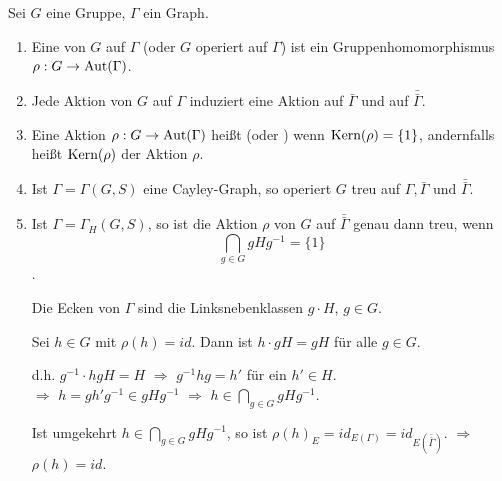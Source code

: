 \documentclass[a4paper, 10pt]{report}
\begin{document}
\begin{DefFolg} 
Sei $G$ eine Gruppe, $\Gamma$ ein Graph.
\begin{enumerate}
  \item Eine  von $G$ auf $\Gamma$ (oder $G$ operiert
  auf $\Gamma$) ist ein Gruppenhomomorphismus $\rho: G \to \mbox{Aut}(\Gamma)$.
  \item Jede Aktion von $G$ auf $\Gamma$ induziert eine Aktion auf
  $\bar{\Gamma}$ und auf $\bar{\bar{\Gamma}}$.
  \item Eine Aktion $\rho: G \to \mbox{Aut}(\Gamma)$ heißt 
  (oder ) wenn $\mbox{Kern}(\rho) = \{1\}$,
  andernfalls heißt $\mbox{Kern}(\rho)$
   der Aktion $\rho$.
  \item Ist $\Gamma = \Gamma(G,S)$ eine Cayley-Graph, so operiert $G$ treu auf
  $\Gamma, \bar{\Gamma} \textrm{ und }\bar{\bar{\Gamma}}$.
  \item Ist $\Gamma = \Gamma_H(G,S)$, so ist die Aktion $\rho$ von $G$ auf $\bar{\bar\Gamma}$ genau dann treu, wenn $$\bigcap_{g \in G} g H g^{-1} = \{1\}$$.

\begin{Bew}
Die Ecken von $\Gamma$ sind die Linksnebenklassen $g \cdot H$, $g \in G$.

Sei $h \in G$ mit $\rho(h) = id$. Dann ist $h \cdot gH = gH$ f\"ur alle $g \in G$.

d.h. $g^{-1} \cdot h gH = H$ $\Rightarrow$ $g^{-1} h g = h'$ f\"ur ein $h' \in H$.\\
$\Rightarrow$ $h = g h' g^{-1} \in g H g^{-1}$ $\Rightarrow$ $h \in \bigcap_{g \in G} g H g^{-1}$.

Ist umgekehrt $h \in \bigcap_{g \in G} gHg^{-1}$, so ist $\rho(h)_E = id_{E(\Gamma)} = {id}_{E(\bar{\bar\Gamma})}$. $\Rightarrow$ $\rho(h) = id$.
\end{Bew}

\end{enumerate}
\end{DefFolg}
\end{document}
